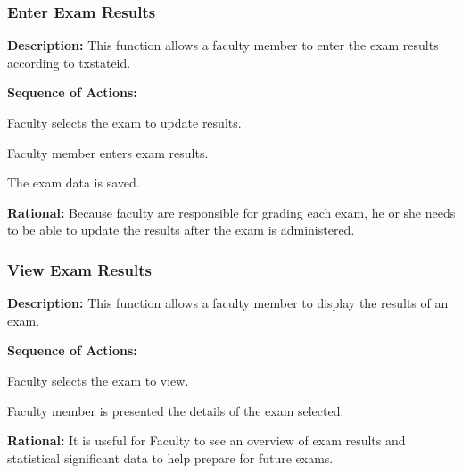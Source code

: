    \subsubsection{\large Enter Exam Results} 
   \begin{boxed} %
      \textbf{Description:}
      {\small This function allows a faculty member to enter the exam results
         according to txstateid.}
         
         \textbf{Sequence of Actions:}
         \begin{enumerate}
               {\small
            \item Faculty selects the exam to update results.
            \item Faculty member enters exam results.
            \item The exam data is saved. }
         \end{enumerate}

         \textbf{Rational:}
         {\small Because faculty are responsible for grading each exam, he or she needs
         to be able to update the results after the exam is administered.}
   \end{boxed} %

   \subsubsection{\large View Exam Results} 
   \begin{boxed} %
      \textbf{Description:}
      {\small This function allows a faculty member to display the results of an
         exam.}
         
         \textbf{Sequence of Actions:}
         \begin{enumerate}
               {\small
            \item Faculty selects the exam to view.
            \item Faculty member is presented the details of the exam selected.}
         \end{enumerate}

         \textbf{Rational:}
         {\small It is useful for Faculty to see an overview of exam results and
         statistical significant data to help prepare for future exams.}
   \end{boxed} %

